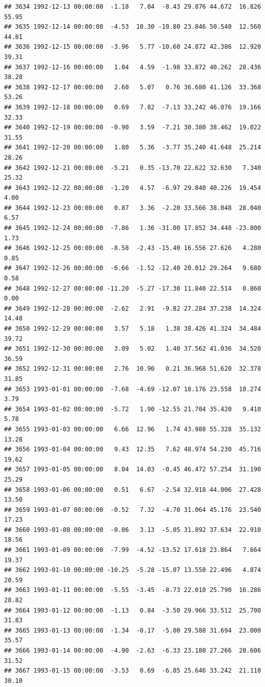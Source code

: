 \documentclass{article}\usepackage{graphicx, color}
\makeatletter
\newenvironment{kframe}{%
 \def\at@end@of@kframe{}%
 \ifinner\ifhmode%
  \def\at@end@of@kframe{\end{minipage}}%
  \begin{minipage}{\columnwidth}%
 \fi\fi%
 \def\FrameCommand##1{\hskip\@totalleftmargin \hskip-\fboxsep
 \colorbox{shadecolor}{##1}\hskip-\fboxsep
     \hskip-\linewidth \hskip-\@totalleftmargin \hskip\columnwidth}%
 \MakeFramed {\advance\hsize-\width
   \@totalleftmargin\z@ \linewidth\hsize
   \@setminipage}}%
 {\par\unskip\endMakeFramed%
 \at@end@of@kframe}
\newenvironment{knitrout}{}{} %
\makeatother
\begin{document}
\begin{knitrout}
\begin{kframe}
\begin{verbatim}
## 3634 1992-12-13 00:00:00  -1.18   7.04  -8.43 29.876 44.672  16.826  55.95
## 3635 1992-12-14 00:00:00  -4.53  10.30 -10.80 23.846 50.540  12.560  44.81
## 3636 1992-12-15 00:00:00  -3.96   5.77 -10.60 24.872 42.386  12.920  39.31
## 3637 1992-12-16 00:00:00   1.04   4.59  -1.98 33.872 40.262  28.436  38.28
## 3638 1992-12-17 00:00:00   2.60   5.07   0.76 36.680 41.126  33.368  53.26
## 3639 1992-12-18 00:00:00   0.69   7.82  -7.13 33.242 46.076  19.166  32.33
## 3640 1992-12-19 00:00:00  -0.90   3.59  -7.21 30.380 38.462  19.022  31.55
## 3641 1992-12-20 00:00:00   1.80   5.36  -3.77 35.240 41.648  25.214  28.26
## 3642 1992-12-21 00:00:00  -5.21   0.35 -13.70 22.622 32.630   7.340  25.32
## 3643 1992-12-22 00:00:00  -1.20   4.57  -6.97 29.840 40.226  19.454   4.00
## 3644 1992-12-23 00:00:00   0.87   3.36  -2.20 33.566 38.048  28.040   6.57
## 3645 1992-12-24 00:00:00  -7.86   1.36 -31.00 17.852 34.448 -23.800   1.73
## 3646 1992-12-25 00:00:00  -8.58  -2.43 -15.40 16.556 27.626   4.280   0.85
## 3647 1992-12-26 00:00:00  -6.66  -1.52 -12.40 20.012 29.264   9.680   0.58
## 3648 1992-12-27 00:00:00 -11.20  -5.27 -17.30 11.840 22.514   0.860   0.00
## 3649 1992-12-28 00:00:00  -2.62   2.91  -9.82 27.284 37.238  14.324  14.48
## 3650 1992-12-29 00:00:00   3.57   5.18   1.38 38.426 41.324  34.484  39.72
## 3651 1992-12-30 00:00:00   3.09   5.02   1.40 37.562 41.036  34.520  36.59
## 3652 1992-12-31 00:00:00   2.76  10.90   0.21 36.968 51.620  32.378  31.85
## 3653 1993-01-01 00:00:00  -7.68  -4.69 -12.07 18.176 23.558  10.274   3.79
## 3654 1993-01-02 00:00:00  -5.72   1.90 -12.55 21.704 35.420   9.410   5.78
## 3655 1993-01-03 00:00:00   6.66  12.96   1.74 43.988 55.328  35.132  13.28
## 3656 1993-01-04 00:00:00   9.43  12.35   7.62 48.974 54.230  45.716  19.62
## 3657 1993-01-05 00:00:00   8.04  14.03  -0.45 46.472 57.254  31.190  25.29
## 3658 1993-01-06 00:00:00   0.51   6.67  -2.54 32.918 44.006  27.428  13.50
## 3659 1993-01-07 00:00:00  -0.52   7.32  -4.70 31.064 45.176  23.540  17.23
## 3660 1993-01-08 00:00:00  -0.06   3.13  -5.05 31.892 37.634  22.910  18.56
## 3661 1993-01-09 00:00:00  -7.99  -4.52 -13.52 17.618 23.864   7.664  19.37
## 3662 1993-01-10 00:00:00 -10.25  -5.28 -15.07 13.550 22.496   4.874  20.59
## 3663 1993-01-11 00:00:00  -5.55  -3.45  -8.73 22.010 25.790  16.286  28.82
## 3664 1993-01-12 00:00:00  -1.13   0.84  -3.50 29.966 33.512  25.700  31.83
## 3665 1993-01-13 00:00:00  -1.34  -0.17  -5.00 29.588 31.694  23.000  35.57
## 3666 1993-01-14 00:00:00  -4.90  -2.63  -6.33 23.180 27.266  20.606  31.52
## 3667 1993-01-15 00:00:00  -3.53   0.69  -6.05 25.646 33.242  21.110  30.10

\end{verbatim}
\end{kframe}
\end{knitrout}
\end{document}
